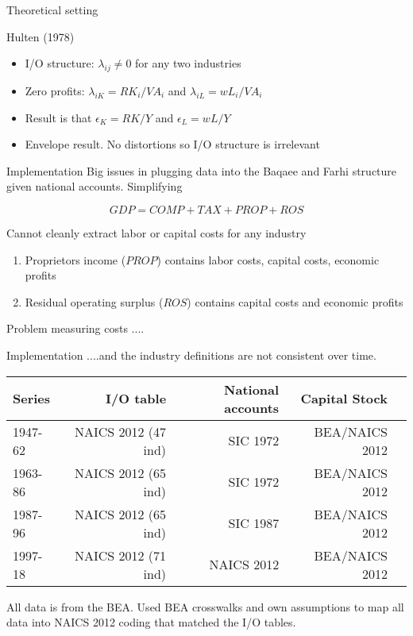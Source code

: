\documentclass[10pt, xcolor=dvipsnames]{beamer}
\begin{document}
\begin{frame}{Theoretical setting}

Hulten (1978)
\begin{itemize}
  \item I/O structure: $\lambda_{ij} \neq 0$ for any two industries
  \item Zero profits: $\lambda_{iK} = RK_i/VA_i$ and $\lambda_{iL} = wL_i/VA_i$
  \item Result is that $\epsilon_K = RK/Y$ and $\epsilon_L = wL/Y$
  \item Envelope result. No distortions so I/O structure is irrelevant
\end{itemize}

\end{frame}

\begin{frame}{Implementation}
Big issues in plugging data into the Baqaee and Farhi structure given national accounts. Simplifying

\begin{equation}
  GDP = COMP + TAX + PROP + ROS
\end{equation}

Cannot cleanly extract labor or capital costs for any industry
\begin{enumerate}
  \item Proprietors income ($PROP$) contains labor costs, capital costs, economic profits
  \item Residual operating surplus ($ROS$) contains capital costs and economic profits
\end{enumerate}

Problem measuring costs ....

\end{frame}

\begin{frame}{Implementation}
....and the industry definitions are not consistent over time.

\vspace{.25in}

\begin{tabular}{lrrrr}
Series  & I/O table  & National accounts & Capital Stock \\ \hline
1947-62 & NAICS 2012 (47 ind) & SIC 1972 & BEA/NAICS 2012 \\
1963-86 & NAICS 2012 (65 ind) & SIC 1972 & BEA/NAICS 2012 \\
1987-96 & NAICS 2012 (65 ind) & SIC 1987 & BEA/NAICS 2012 \\
1997-18 & NAICS 2012 (71 ind) & NAICS 2012 & BEA/NAICS 2012 \\ \hline
\end{tabular}

\vspace{.25in} All data is from the BEA. Used BEA crosswalks and own assumptions to map all data into NAICS 2012 coding that matched the I/O tables.
\end{frame}
\end{document}
